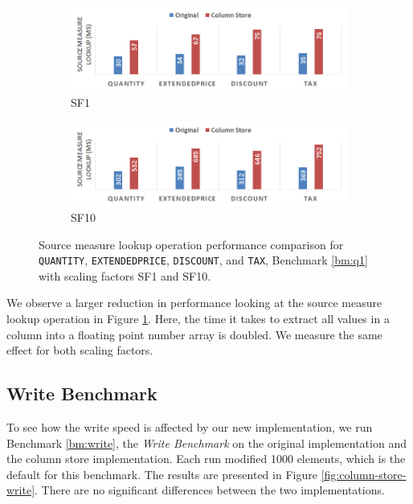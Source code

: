 \begin{figure}
    \centering
    \begin{subfigure}{1.0\textwidth}
        \includegraphics[width=\textwidth]{img/column-store-sml-sf001.png}
        \caption{SF1}
    \end{subfigure}
    \begin{subfigure}{1.0\textwidth}
        \includegraphics[width=\textwidth]{img/column-store-sml-sf010.png}
        \caption{SF10}
    \end{subfigure}
    \caption{Source measure lookup operation performance comparison for \texttt{QUANTITY}, \texttt{EXTENDEDPRICE}, \texttt{DISCOUNT}, and \texttt{TAX}, Benchmark \ref{bm:q1} with scaling factors SF1 and SF10.}
    \label{fig:column-store-sml}
\end{figure}

We observe a larger reduction in performance looking at the source measure lookup operation in Figure \ref{fig:column-store-sml}. Here, the time it takes to extract all values in a column into a floating point number array is doubled. We measure the same effect for both scaling factors.

\subsection{Write Benchmark}
\label{sub:Write Benchmark}


To see how the write speed is affected by our new implementation, we run Benchmark \ref{bm:write}, the \textit{Write Benchmark} on the original implementation and the column store implementation. Each run modified 1000 elements, which is the default for this benchmark. The results are presented in Figure \ref{fig:column-store-write}. There are no significant differences between the two implementations.


